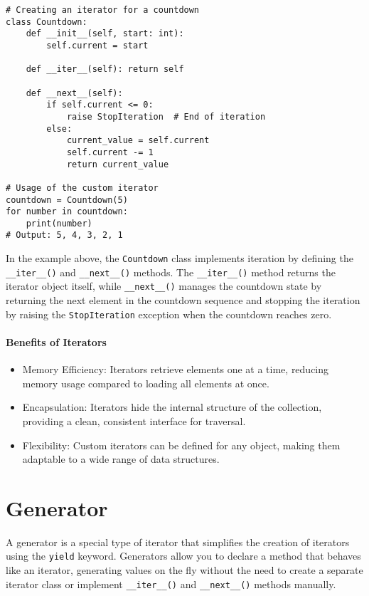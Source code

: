 \documentclass[oneside,11pt,dvipsnames]{book}
\newcommand{\code}[1]{\texttt{#1}}
\begin{document}
\begin{lstlisting}
# Creating an iterator for a countdown
class Countdown:
    def __init__(self, start: int):
        self.current = start

    def __iter__(self): return self

    def __next__(self):
        if self.current <= 0:
            raise StopIteration  # End of iteration
        else:
            current_value = self.current
            self.current -= 1
            return current_value

# Usage of the custom iterator
countdown = Countdown(5)
for number in countdown:
    print(number)
# Output: 5, 4, 3, 2, 1
\end{lstlisting}

In the example above, the \code{Countdown} class implements iteration by defining the \code{\_\_iter\_\_()} and \code{\_\_next\_\_()} methods. The \code{\_\_iter\_\_()} method returns the iterator object itself, while \code{\_\_next\_\_()} manages the countdown state by returning the next element in the countdown sequence and stopping the iteration by raising the \code{StopIteration} exception when the countdown reaches zero.


\paragraph{Benefits of Iterators}
\begin{itemize}
\item Memory Efficiency: Iterators retrieve elements one at a time, reducing memory usage compared to loading all elements at once.
\item Encapsulation: Iterators hide the internal structure of the collection, providing a clean, consistent interface for traversal.
\item Flexibility: Custom iterators can be defined for any object, making them adaptable to a wide range of data structures.
\end{itemize}


\section{Generator}
A generator is a special type of iterator that simplifies the creation of iterators using the \code{yield} keyword. Generators allow you to declare a method that behaves like an iterator, generating values on the fly without the need to create a separate iterator class or implement \code{\_\_iter\_\_()} and \code{\_\_next\_\_()} methods manually.
\end{document}
